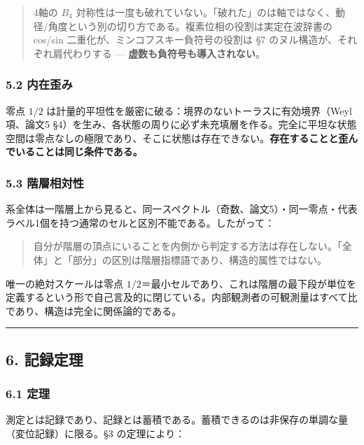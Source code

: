 \documentclass[
]{ltjsarticle}
\begin{document}
\begin{quote}
4軸の \(B_4\)
対称性は一度も破れていない。「破れた」のは軸ではなく、動径/角度という別の切り方である。複素位相の役割は実定在波辞書の
cos/sin 二重化が、ミンコフスキー負符号の役割は §7
のヌル構造が、それぞれ肩代わりする ---
\textbf{虚数も負符号も導入されない}。
\end{quote}

\subsubsection{5.2 内在歪み}\label{ux5185ux5728ux6b6aux307f}

零点 \(1/2\)
は計量的平坦性を厳密に破る：境界のないトーラスに有効境界（Weyl 項、論文5
§4）を生み、各状態の周りに必ず未充填層を作る。完全に平坦な状態空間は零点なしの極限であり、そこに状態は存在できない。\textbf{存在することと歪んでいることは同じ条件である。}

\subsubsection{5.3 階層相対性}\label{ux968eux5c64ux76f8ux5bfeux6027}

系全体は一階層上から見ると、同一スペクトル（奇数、論文5）・同一零点・代表ラベル1個を持つ通常のセルと区別不能である。したがって：

\begin{quote}
自分が階層の頂点にいることを内側から判定する方法は存在しない。「全体」と「部分」の区別は階層指標語であり、構造的属性ではない。
\end{quote}

唯一の絶対スケールは零点
\(1/2\)＝最小セルであり、これは階層の最下段が単位を定義するという形で自己言及的に閉じている。内部観測者の可観測量はすべて比であり、構造は完全に関係論的である。

\begin{center}\rule{0.5\linewidth}{0.5pt}\end{center}

\subsection{6. 記録定理}\label{ux8a18ux9332ux5b9aux7406}

\subsubsection{6.1 定理}\label{ux5b9aux7406}

測定とは記録であり、記録とは蓄積である。蓄積できるのは非保存の単調な量（変位記録）に限る。§3
の定理により：
\end{document}
